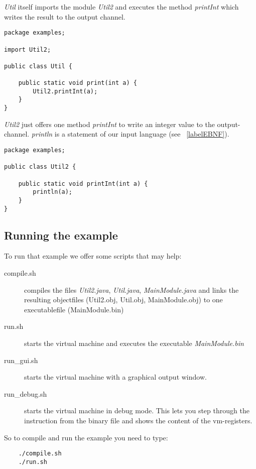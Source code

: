 \emph{Util} itself imports the module \emph{Util2} and executes the method
\emph{printInt} which writes the result to the output channel.
\begin{lstlisting}[caption="Util.java"]
package examples;

import Util2;

public class Util {
	
	public static void print(int a) {
		Util2.printInt(a);
	}
}
\end{lstlisting}

\emph{Util2} just offers one method \emph{printInt} to write an integer value to
the output-channel. \emph{println} is a statement of our input language (see
~\ref{labelEBNF}).

\begin{lstlisting}[caption="Util2.java"]
package examples;

public class Util2 {

	public static void printInt(int a) {
		println(a);
	}
}
\end{lstlisting}
\subsection{Running the example}
To run that example we offer some scripts that may help: 
\begin{description}
\item[compile.sh] compiles the files \emph{Util2.java}, \emph{Util.java},
\emph{MainModule.java} and links the resulting objectfiles (Util2.obj, Util.obj,
MainModule.obj) to one executablefile (MainModule.bin) 
\item[run.sh] starts the virtual machine and executes the executable \emph{MainModule.bin}
\item[run\_gui.sh] starts the virtual machine with a graphical output window. 
\item[run\_debug.sh] starts the virtual machine in debug mode. This lets you step
through the instruction from the binary file and shows the content of the vm-registers. 
\end{description}
So to compile and run the example you need to type: 
\begin{lstlisting}
	./compile.sh
	./run.sh
\end{lstlisting}